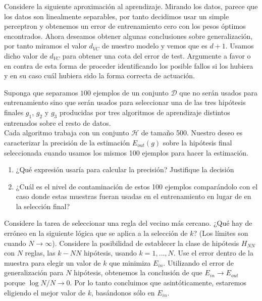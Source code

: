\documentclass[12pt]{article}
\theoremstyle{definition}
\begin{document}
\begin{pregunta}
Considere la siguiente aproximación al aprendizaje. Mirando los datos, parece que los datos son linealmente separables, por tanto decidimos usar un simple perceptron y obtenemos un error de entrenamiento cero con los pesos óptimos encontrados. Ahora deseamos obtener algunas conclusiones sobre generalización, por tanto miramos el valor $d_{VC}$ de nuestro modelo y vemos que es $d + 1$. Usamos dicho valor de $d_{VC}$ para obtener una cota del error de test. Argumente a favor o en contra de esta forma de proceder identificando los posible fallos si los hubiera y en su caso cuál hubiera sido la forma correcta de actuación.\\


\end{pregunta}

\begin{pregunta}
Suponga que separamos $100$ ejemplos de un conjunto $\mathcal{D}$ que no serán usados para entrenamiento sino que serán usados para seleccionar una de las tres hipótesis finales $g_1$, $g_2$ y $g_3$ producidas por tres algoritmos de aprendizaje distintos entrenados sobre el resto de datos.\\
Cada algoritmo trabaja con un conjunto $\mathcal{H}$ de tamaño 500. Nuestro deseo es caracterizar la precisión de la estimación $E_{out}(g)$ sobre la hipótesis final seleccionada cuando usamos los mismos 100 ejemplos para hacer la estimación.
\begin{enumerate}[a]
\item ¿Qué expresión usaría para calcular la precisión? Justifique la decisión
\item ¿Cuál es el nivel de contaminación de estos 100 ejemplos comparándolo con el caso donde estas muestras fueran usadas en el entrenamiento en lugar de en la selección final?
\end{enumerate}


\end{pregunta}

\begin{pregunta}
Considere la tarea de seleccionar una regla del vecino más cercano. ¿Qué hay de erróneo en la siguiente lógica que se aplica a la selección de $k$? (Los límites son cuando $N \rightarrow \infty$).
Considere la posibilidad de establecer la clase de hipótesis $H_{NN}$ con $N$ reglas, las $k-NN$ hipótesis, usando $k =1,\dots,N$. Use el error dentro de la muestra para elegir un valor de $k$ que minimiza $E_{in}$. Utilizando el error de generalización para $N$ hipótesis, obtenemos la conclusión
de que $E_{in} \rightarrow E_{out}$ porque $\log N/N \rightarrow 0$. Por lo tanto concluimos que asintóticamente,
estaremos eligiendo el mejor valor de $k$, basándonos sólo en $E_{in}$.\\


\end{pregunta}
\end{document}
